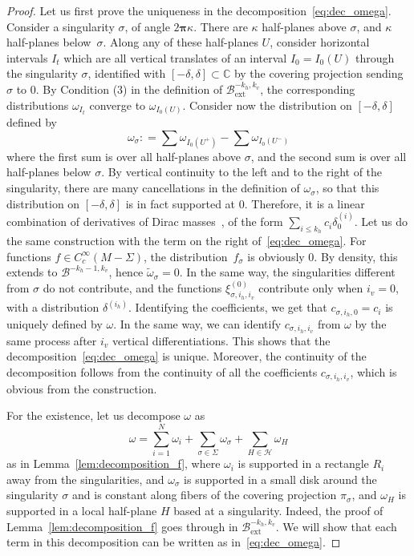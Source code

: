 \documentclass[10pt]{amsart}
\newcommand{\ext}{\mathrm{ext}}
\newcommand{\boH}{\mathcal{H}}
\newcommand{\boB}{\mathcal{B}}
\newcommand{\CC}{\mathbb{C}}
\newcommand{\bpi}{\boldsymbol{\pi}}
\newcommand{\coloneqq}{\mathrel{\mathop:}=}
\theoremstyle{definition}
\numberwithin{equation}{section}
\begin{document}
\begin{proof}
Let us first prove the uniqueness in the decomposition~\eqref{eq:dec_omega}.
Consider a singularity $\sigma$, of angle $2\bpi\kappa$. There are $\kappa$
half-planes above $\sigma$, and $\kappa$ half-planes below~$\sigma$. Along
any of these half-planes $U$, consider horizontal intervals $I_t$ which are
all vertical translates of an interval $I_0=I_0(U)$ through the singularity
$\sigma$, identified with \hbox{$[-\delta,\delta] \subset \CC$} by the covering
projection sending $\sigma$ to $0$. By Condition (3) in the definition of
$\boB_{\ext}^{-k_h, k_v}$, the corresponding distributions $\omega_{I_t}$
converge to $\omega_{I_0(U)}$. Consider now the distribution on
$[-\delta,\delta]$ defined by
\begin{equation*}
\omega_\sigma \coloneqq \sum \omega_{I_0(U^+)} - \sum \omega_{I_0(U^-)}
\end{equation*}
where the first sum is over all half-planes above $\sigma$, and the second
sum is over all half-planes below $\sigma$. By vertical continuity to the
left and to the right of the singularity, there are many cancellations in the
definition of $\omega_\sigma$, so that this distribution on $[-\delta,
\delta]$ is in fact supported at $0$. Therefore, it is a linear combination
of derivatives of Dirac masses~\cite[Th.\,2.3.4]{hormander}, of the form
$\sum_{i\leq k_h} c_i \delta^{(i)}_0$. Let us do the same construction with
the term on the right of~\eqref{eq:dec_omega}. For functions $f \in
C^\infty_c(M-\Sigma)$, the distribution~$f_\sigma$ is obviously $0$. By
density, this extends to $\boB^{-k_h-1, k_v}$, hence $\tilde \omega_\sigma =
0$. In the same way, the singularities different from $\sigma$ do not
contribute, and the functions $\xi^{(0)}_{\sigma, i_h, i_v}$ contribute only
when $i_v = 0$, with a distribution $\delta^{(i_h)}$. Identifying the
coefficients, we get that $c_{\sigma, i_h, 0} = c_i$ is uniquely defined by
$\omega$. In the same way, we can identify $c_{\sigma, i_h, i_v}$ from
$\omega$ by the same process after $i_v$ vertical differentiations. This
shows that the decomposition~\eqref{eq:dec_omega} is unique. Moreover, the
continuity of the decomposition follows from the continuity of all the
coefficients $c_{\sigma, i_h, i_v}$, which is obvious from the construction.

For the existence, let us decompose $\omega$ as
\begin{equation*}
\omega = \sum_{i=1}^N \omega_i + \sum_{\sigma\in \Sigma} \omega_\sigma + \sum_{H \in \boH} \omega_H
\end{equation*}
as in Lemma~\ref{lem:decomposition_f}, where $\omega_i$ is supported in a
rectangle $R_i$ away from the singularities, and $\omega_\sigma$ is supported
in a small disk around the singularity $\sigma$ and is constant along fibers
of the covering projection $\pi_\sigma$, and $\omega_H$ is supported in a
local half-plane $H$ based at a singularity. Indeed, the proof of
Lemma~\ref{lem:decomposition_f} goes through in $\boB^{-k_h, k_v}_{\ext}$. We
will show that each term in this decomposition can be written as
in~\eqref{eq:dec_omega}.


\end{proof}
\end{document}
